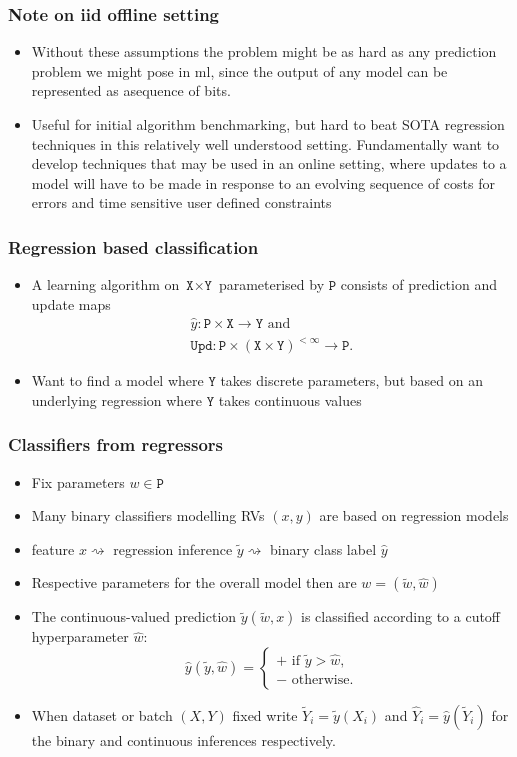 \documentclass{beamer}
\newcommand{\IN}{{\texttt{X}}}
\newcommand{\OUT}{{\texttt{Y}}}
\newcommand{\PAR}{{\texttt{P}}}
\newcommand{\CO}{{\hat w}}
\newcommand{\NNW}{{\tilde w}}
\newcommand{\PRED}{{\hat y}}%
\newcommand{\PREDSMOOTH}{{\tilde y}}%
\newcommand{\yP}{{\hat y}}
\newcommand{\YP}{{\hat Y}}
\newcommand{\YN}{{\tilde Y}}
\newcommand{\UPD}{{\texttt{Upd}}}
\begin{document}
\begin{frame}
\frametitle{Note on iid offline setting}
\begin{itemize}
  \item
    Without these assumptions the problem might be as hard as any prediction problem we might pose in ml, since the output of any model can be represented as asequence of bits.
  \item
    Useful for initial algorithm benchmarking, but hard to beat SOTA regression techniques in this relatively well understood setting.
    Fundamentally want to develop techniques that may be used in an online setting, where updates to a model will have to be made in response to an evolving sequence of costs for errors and time sensitive user defined constraints
\end{itemize}
\end{frame}
\begin{frame}
\frametitle{Regression based classification}
\begin{itemize}
\item
  A learning algorithm on $\IN\times\OUT$ parameterised by $\PAR$ consists of prediction and update maps
\begin{gather*}
  \PRED:\PAR\times\IN\rightarrow\OUT\text{ and}\\
  \UPD:\PAR\times\left(\IN\times\OUT\right)^{<\infty}\rightarrow\PAR.
\end{gather*}
\item
  Want to find a model where $\OUT$ takes discrete parameters, but based on an underlying regression where $\OUT$ takes continuous values
\end{itemize}
\end{frame}
\begin{frame}
\frametitle{Classifiers from regressors}
\begin{itemize}
\item
  Fix parameters $w\in\PAR$
\item
  Many binary classifiers modelling RVs $(x,y)$ are based on regression models
\item
  feature $x\rightsquigarrow$ regression inference $\PREDSMOOTH\rightsquigarrow$ binary class label $\PRED$
\item
  Respective parameters for the overall model then are $w=(\NNW,\CO)$
\item
  The continuous-valued prediction $\PREDSMOOTH(\NNW,x)$ is classified according to a cutoff hyperparameter $\CO$:
  $$
  \PRED(\PREDSMOOTH,\CO)=\begin{cases}+\text{ if }\tilde y>\CO,\\-\text{ otherwise.}\end{cases}
  $$
\item
  When dataset or batch $(X,Y)$ fixed write $\YN_i=\PREDSMOOTH(X_i)$ and $\YP_i=\yP(\YN_i)$ for the binary and continuous inferences respectively.
\end{itemize}
\end{frame}
\end{document}
